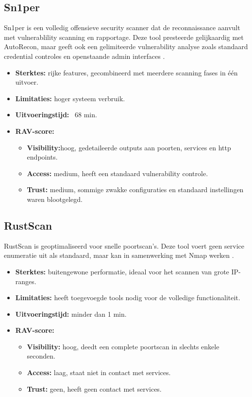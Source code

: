 \subsection{Sn1per}
Sn1per is een volledig offensieve security scanner dat de reconnaissance aanvult met vulnerablility scanning en rapportage. 
Deze tool presteerde gelijkaardig met AutoRecon, maar geeft ook een gelimiteerde vulnerability analyse zoals standaard credential controles en openstaande admin interfaces \autocite{sn1per}.

\begin{itemize}
  \item \textbf{Sterktes:} rijke features, gecombineerd met meerdere scanning fases in één uitvoer.
  \item \textbf{Limitaties:} hoger systeem verbruik.
  \item \textbf{Uitvoeringstijd:} ~68 min.
  \item \textbf{RAV-score:}
    \small{
    \begin{itemize}
      \item \textbf{Visibility:}hoog, gedetaileerde outputs aan poorten, services en http endpoints.
      \item \textbf{Access:} medium, heeft een standaard vulnerability controle.
      \item \textbf{Trust:} medium, sommige zwakke configuraties en standaard instellingen waren blootgelegd.
    \end{itemize}
    }
\end{itemize}


\subsection{RustScan}

RustScan is geoptimaliseerd voor snelle poortscan's. 
Deze tool voert geen service enumeratie uit als standaard, maar kan in samenwerking met Nmap werken \autocite{RustScan}. 

\begin{itemize}
  \item \textbf{Sterktes:} buitengewone performatie, ideaal voor het scannen van grote IP-ranges.
  \item \textbf{Limitaties:} heeft toegevoegde tools nodig voor de volledige functionaliteit. 
  \item \textbf{Uitvoeringstijd:} minder dan 1 min.
  \item \textbf{RAV-score:}
    \small{
    \begin{itemize}
      \item \textbf{Visibility:} hoog, deedt een complete poortscan in slechts enkele seconden.
      \item \textbf{Access:} laag, staat niet in contact met services. 
      \item \textbf{Trust:} geen, heeft geen contact met services.
    \end{itemize}
    }
\end{itemize}

